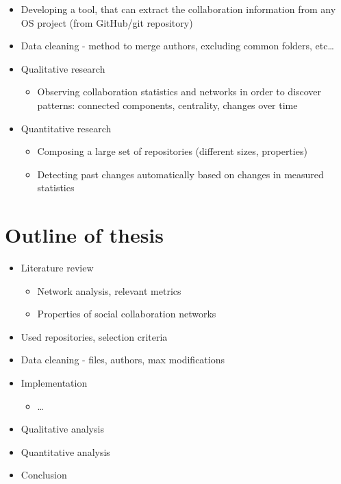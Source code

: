 \begin{itemize}
    \item Developing a tool, that can extract the collaboration information from any OS project (from GitHub/git repository)
    \item Data cleaning - method to merge authors, excluding common folders, etc\dots
    \item Qualitative research
    \begin{itemize}
        \item Observing collaboration statistics and networks in order to discover patterns: connected components, centrality, changes over time
    \end{itemize}
    \item Quantitative research
    \begin{itemize}
        \item Composing a large set of repositories (different sizes, properties)
        \item Detecting past changes automatically based on changes in measured statistics
    \end{itemize}
\end{itemize}

\section{Outline of thesis}
\begin{itemize}
    \item Literature review
    \begin{itemize}
        \item Network analysis, relevant metrics
        \item Properties of social collaboration networks
    \end{itemize}
    \item Used repositories, selection criteria
    \item Data cleaning - files, authors, max modifications
    \item Implementation
    \begin{itemize}
        \item \dots
    \end{itemize}
    \item Qualitative analysis
    \item Quantitative analysis
    \item Conclusion
\end{itemize}


